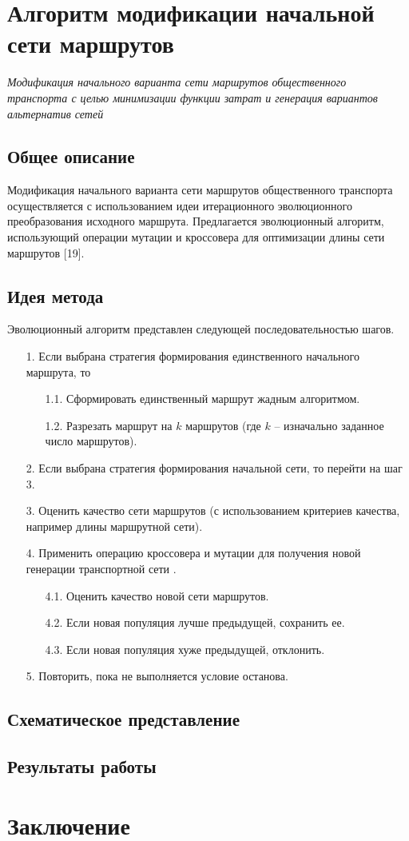 \section{Алгоритм модификации начальной сети маршрутов}
\label{sec:third-alg}
\emph{Модификация начального варианта сети маршрутов общественного транспорта с целью минимизации функции 
затрат и генерация вариантов альтернатив сетей}
\subsection{Общее описание}
Модификация начального варианта сети маршрутов общественного транспорта осуществляется с использованием идеи 
итерационного эволюционного преобразования исходного маршрута. Предлагается эволюционный алгоритм, 
использующий операции мутации и кроссовера для оптимизации длины сети маршрутов [19].

\subsection{Идея метода}
Эволюционный алгоритм представлен следующей последовательностью шагов. 
\begin{enumerate}
    \item[1.] Если выбрана стратегия формирования единственного начального маршрута, то 
    \begin{enumerate}
        \item[1.1.] Сформировать единственный маршрут жадным алгоритмом.
        \item[1.2.] Разрезать маршрут на \( k \) маршрутов (где \( k \) -- изначально заданное число 
            маршрутов).
    \end{enumerate}
    \item[2.] Если выбрана стратегия формирования начальной сети, то перейти на шаг 3.
    \item[3.] Оценить качество сети маршрутов (с использованием критериев качества, например длины 
        маршрутной сети).
    \item[4.] Применить операцию кроссовера и мутации для получения новой генерации транспортной 
        сети \cite{bib:20}.
    \begin{enumerate}
        \item[4.1.] Оценить качество новой сети маршрутов.
        \item[4.2.] Если новая популяция лучше предыдущей, сохранить ее.
        \item[4.3.] Если новая популяция хуже предыдущей, отклонить. 
    \end{enumerate}
    \item[5.] Повторить, пока не выполняется условие останова.
\end{enumerate}

\subsection{Схематическое представление}
\subsection{Результаты работы}

\section{Заключение}